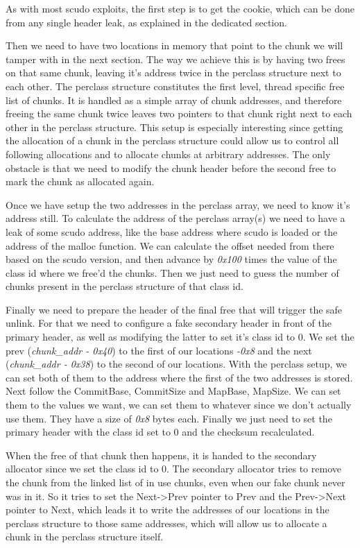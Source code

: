 \documentclass[a4paper,11pt,oneside]{report}
\begin{document}
As with most scudo exploits, the first step is to get the cookie, which can be done from
any single header leak, as explained in the dedicated section.

Then we need to have two locations in memory that point to the chunk we will tamper with
in the next section. The way we achieve this is by having two frees on that same chunk,
leaving it's address twice in the perclass structure next to each other. The perclass
structure constitutes the first level, thread specific free list of chunks. It is handled
as a simple array of chunk addresses, and therefore freeing the same chunk twice leaves
two pointers to that chunk right next to each other in the perclass structure. This setup
is especially interesting since getting the allocation of a chunk in the perclass
structure could allow us to control all following allocations and to allocate chunks at
arbitrary addresses. The only obstacle is that we need to modify the chunk header before
the second free to mark the chunk as allocated again.

Once we have setup the two addresses in the perclass array, we need to know it's address
still. To calculate the address of the perclass array(s) we need to have a leak of some
scudo address, like the base address where scudo is loaded or the address of the malloc
function. We can calculate the offset needed from there based on the scudo version, and
then advance by \emph{0x100} times the value of the class id where we free'd the
chunks. Then we just need to guess the number of chunks present in the perclass structure
of that class id.

Finally we need to prepare the header of the final free that will trigger the safe
unlink. For that we need to configure a fake secondary header in front of the primary
header, as well as modifying the latter to set it's class id to 0. We set the prev
(\emph{chunk\_addr - 0x40}) to the first of our locations \emph{-0x8} and the next
(\emph{chunk\_addr - 0x38}) to the second of our locations. With the perclass setup, we
can set both of them to the address where the first of the two addresses is stored.  Next
follow the CommitBase, CommitSize and MapBase, MapSize. We can set them to the values we
want, we can set them to whatever since we don't actually use them. They have a size of
\emph{0x8} bytes each.  Finally we just need to set the primary header with the class id
set to 0 and the checksum recalculated.

When the free of that chunk then happens, it is handed to the secondary allocator since we
set the class id to 0. The secondary allocator tries to remove the chunk from the linked
list of in use chunks, even when our fake chunk never was in it. So it tries to set the
Next->Prev pointer to Prev and the Prev->Next pointer to Next, which leads it to write the
addresses of our locations in the perclass structure to those same addresses, which will
allow us to allocate a chunk in the perclass structure itself.
\end{document}
